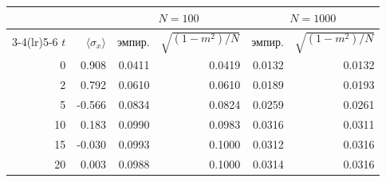 \begin{tabular}{rrrrrr}
\toprule
& & \multicolumn{2}{c}{$N=100$} & \multicolumn{2}{c}{$N=1000$} \\
\cmidrule(lr){3-4}\cmidrule(lr){5-6}
$t$ & $\langle\sigma_x\rangle$ & эмпир. & $\sqrt{(1-m^2)/N}$ & эмпир. & $\sqrt{(1-m^2)/N}$ \\
\midrule
0 & 0.908 & 0.0411 & 0.0419 & 0.0132 & 0.0132 \\
2 & 0.792 & 0.0610 & 0.0610 & 0.0189 & 0.0193 \\
5 & -0.566 & 0.0834 & 0.0824 & 0.0259 & 0.0261 \\
10 & 0.183 & 0.0990 & 0.0983 & 0.0316 & 0.0311 \\
15 & -0.030 & 0.0993 & 0.1000 & 0.0312 & 0.0316 \\
20 & 0.003 & 0.0988 & 0.1000 & 0.0314 & 0.0316 \\
\bottomrule
\end{tabular}
